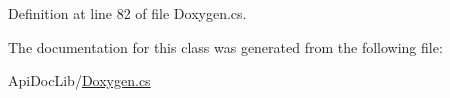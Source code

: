 Definition at line 82 of file Doxygen.\+cs.



The documentation for this class was generated from the following file\+:\begin{DoxyCompactItemize}
\item 
Api\+Doc\+Lib/\hyperlink{_doxygen_8cs}{Doxygen.\+cs}\end{DoxyCompactItemize}
